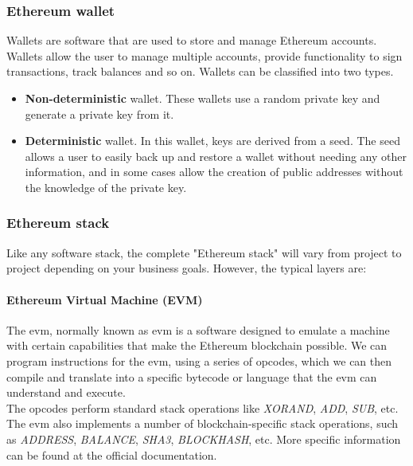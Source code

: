 \documentclass[a4paper, 12pt]{article} %
\begin{document}
        \subsubsection{Ethereum wallet}
            Wallets are software that are used to store and manage Ethereum accounts. Wallets allow the user to manage multiple accounts, provide functionality to sign transactions, track balances and so on. Wallets can be classified into two types.
            \begin{itemize}
                \item \textbf{Non-deterministic} wallet. These wallets use a random private key and generate a private key from it.
                \item \textbf{Deterministic} wallet. In this wallet, keys are derived from a seed. The seed allows a user to easily back up and restore a wallet without needing any other information, and in some cases allow the creation of public addresses without the knowledge of the private key.
            \end{itemize}
        
        \subsubsection{Ethereum stack}
            Like any software stack, the complete "Ethereum stack"\cite{ethereumStack} will vary from project to project depending on your business goals. However, the typical layers are:
            \paragraph{Ethereum Virtual Machine (EVM)}
                The \acrlong{evm}\cite{evm}, normally known as \acrshort{evm} is a software designed to emulate a machine with certain capabilities that make the Ethereum blockchain possible. We can program instructions for the \acrshort{evm}, using a series of opcodes, which we can then compile and translate into a specific bytecode or language that the \acrshort{evm} can understand and execute.\\
                
                The opcodes perform standard stack operations like \textit{XORAND}, \textit{ADD}, \textit{SUB}, etc. The \acrshort{evm} also implements a number of blockchain-specific stack operations, such as \textit{ADDRESS}, \textit{BALANCE}, \textit{SHA3}, \textit{BLOCKHASH}, etc. More specific information can be found at the official documentation\cite{opcodes}.\\
                
\end{document}
